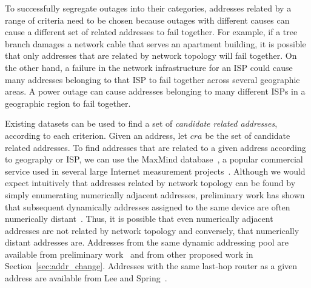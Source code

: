 To successfully segregate outages into their categories,
addresses related by a range of criteria need to be chosen because
outages with different causes can cause a different set of related
addresses to fail together. For example, if a
tree branch damages a network cable that serves an apartment building,
it is possible that only addresses that are related by network
topology will fail together. On the other hand, a failure in the
network infrastructure for an ISP could cause many addresses belonging to that ISP to
fail together across several geographic areas. A power outage can cause
addresses belonging to many different ISPs in a geographic region to
fail together.

Existing datasets can be used to find a set of \emph{candidate related
addresses}, according to
each criterion. Given an address, let $cra$ be the set of
candidate related addresses. To find addresses that are related to a
given address according to geography or ISP, we can use the
MaxMind database~\cite{MaxMind}, a popular commercial service used in
several large Internet measurement projects~\cite{censys-about,
usc-sandy, heidemann-diurnal}. Although we would expect intuitively
that addresses related by network topology can be found by simply
enumerating numerically adjacent addresses, preliminary work has shown
that subsequent dynamically addresses assigned to the same device are
often numerically distant~\cite{addrchange-reasons}. Thus, it is possible that even
numerically adjacent addresses are not related by network topology and
conversely, that numerically distant addresses are. Addresses from the same
dynamic addressing pool are available from preliminary
work~\cite{addrchange-reasons} and from other proposed work in
Section~\ref{sec:addr_change}. Addresses with the same last-hop router
as a given address are available from Lee and
Spring~\cite{hobbit-use-hobbit-imc-instead}. 


